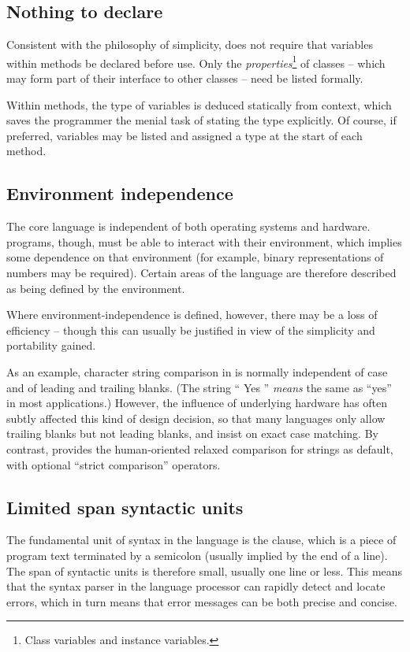 \subsection{Nothing to declare}
Consistent with the philosophy of simplicity, \nr{} does not require
that variables within methods be declared before use. Only the
\emph{properties}\footnote{Class variables and instance variables.} of classes – which may form part of their
interface to other classes – need be listed formally.

Within methods, the type of variables is deduced statically from
context, which saves the programmer the menial task of stating the
type explicitly. Of course, if preferred, variables may be listed and
assigned a type at the start of each method.
\subsection{Environment independence}
The core \nr{} language is independent of both operating systems and hardware. \nr{} programs, though, must be able to interact with their environment, which implies some dependence on that environment (for example, binary representations of numbers may be required). Certain areas of the language are therefore described as being defined by the environment.

Where environment-independence is defined, however, there may be a
loss of efficiency – though this can usually be justified in view of
the simplicity and portability gained.

As an example, character string comparison in \nr{} is normally
independent of case and of leading and trailing blanks. (The string “
Yes ” \emph{means} the same as “yes” in most applications.) However,
the influence of underlying hardware has often subtly affected this
kind of design decision, so that many languages only allow trailing
blanks but not leading blanks, and insist on exact case matching. By
contrast, \nr{} provides the human-oriented relaxed comparison for
strings as default, with optional “strict comparison” operators.

\subsection{Limited span syntactic units}
The fundamental unit of syntax in the \nr{} language is the clause,
which is a piece of program text terminated by a semicolon (usually
implied by the end of a line). The span of syntactic units is
therefore small, usually one line or less. This means that the syntax
parser in the language processor can rapidly detect and locate errors,
which in turn means that error messages can be both precise and concise.


